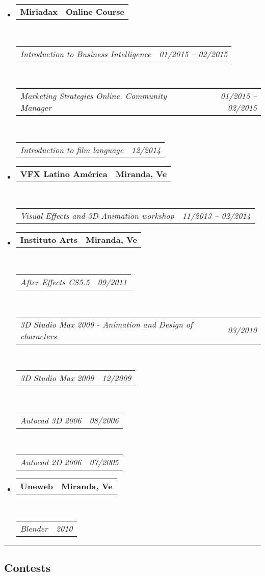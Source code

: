 \documentclass[10pt,letterpaper]{article}
\makeatletter
\newcommand{\headerrow}[2]
{\begin{tabular*}{\linewidth}{l@{\extracolsep{\fill}}r}
	#1 &
	#2 \\
\end{tabular*}}
\makeatother
\begin{document}
\begin{itemize}
	\parskip=0.1em
\item 
   \headerrow
   {\textbf{Miriadax}}
   {\textbf{Online Course}}
  \\
  \headerrow
   {\emph{Introduction to Business Intelligence}}
   {\emph{01/2015 -- 02/2015}}
  \\
  \headerrow
   {\emph{Marketing Strategies Online. Community Manager}}
   {\emph{01/2015 -- 02/2015}}
  \\
  \headerrow
   {\emph{Introduction to film language}}
   {\emph{12/2014}}
\item 
   \headerrow
   {\textbf{VFX Latino América}}
   {\textbf{Miranda, Ve}}
  \\
  \headerrow
   {\emph{Visual Effects and 3D Animation workshop}}
   {\emph{11/2013 -- 02/2014}}

\item 
   \headerrow
   {\textbf{Instituto Arts}}
   {\textbf{Miranda, Ve}}
	\\
	\headerrow
   {\emph{After Effects CS5.5}}
   {\emph{09/2011}}
	\\
	\headerrow
   {\emph{3D Studio Max 2009 - Animation and Design of characters}}
   {\emph{03/2010}}
	\\
	\headerrow
   {\emph{3D Studio Max 2009}}
   {\emph{12/2009}}
	\\
	\headerrow
   {\emph{Autocad 3D 2006 }}
   {\emph{08/2006}}
	\\
	\headerrow
   {\emph{Autocad 2D 2006}}
   {\emph{07/2005}}

\item 
   \headerrow
   {\textbf{Uneweb}}
   {\textbf{Miranda, Ve}}
	\\
	\headerrow
   {\emph{Blender}}
   {\emph{2010}}
\end{itemize}



\hrule
\vspace{-0.4em}
\subsection*{Contests}
\end{document}
